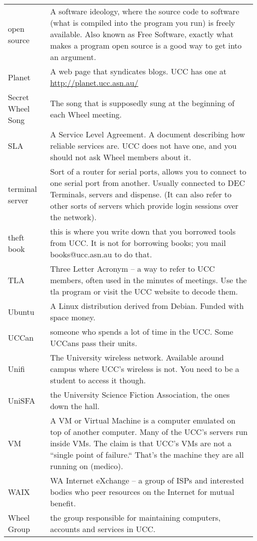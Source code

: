 \begin{tabular}{ll}
open source &
A software ideology, where the source code to software (what is compiled into the program you run) is freely available. Also known as Free Software, exactly what makes a program open source is a good way to get into an argument. \\
Planet &
A web page that syndicates blogs. UCC has one at \url{http://planet.ucc.asn.au/} \\
Secret Wheel Song &
The song that is supposedly sung at the beginning of each Wheel meeting. \\ %
SLA &
A Service Level Agreement. A document describing how reliable services are. UCC does not have one, and you should not ask Wheel members about it. \\
terminal server &
Sort of a router for serial ports, allows you to connect to one serial port from another. Usually connected to DEC Terminals, servers and dispense. (It can also refer to other sorts of servers which provide login sessions over the network). \\
theft book &
this is where you write down that you borrowed tools from UCC. It is not for borrowing books; you mail books@ucc.asn.au to do that. \\
TLA &
Three Letter Acronym – a way to refer to UCC members, often used in the minutes of meetings. Use the tla program or visit the UCC website to decode them. \\
Ubuntu &
A Linux distribution derived from Debian. Funded with space money. \\
UCCan &
someone who spends a lot of time in the UCC. Some UCCans pass their units. \\
Unifi &
The University wireless network. Available around campus where UCC's wireless is not. You need to be a student to access it though. \\
UniSFA &
the University Science Fiction Association, the ones down the hall. \\
VM &
A VM or Virtual Machine is a computer emulated on top of another computer. Many of the UCC's servers run inside VMs. The claim is that UCC's VMs are not a ``single point of  failure.`` That's the machine they are all running on (medico). \\
WAIX &
WA Internet eXchange – a group of ISPs and interested bodies who peer resources on the Internet for mutual benefit. \\
Wheel Group &
the group responsible for maintaining computers, accounts and services in UCC. \\
\end{tabular}
